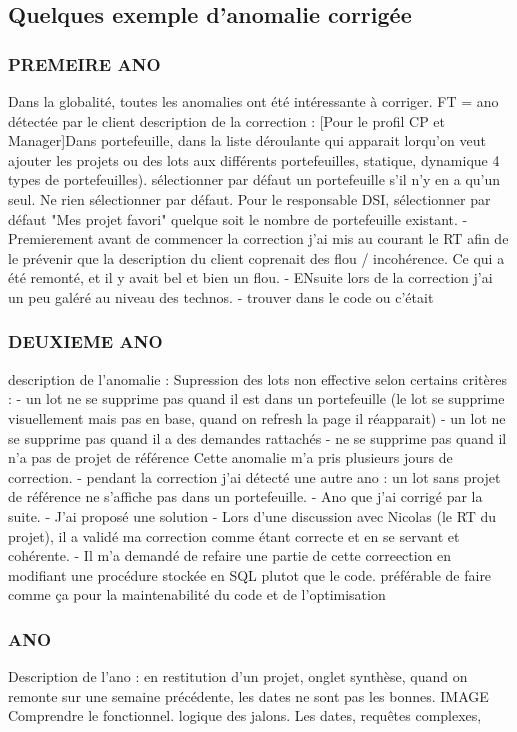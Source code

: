 \subsection{Quelques exemple d'anomalie corrigée}
\subsubsection{PREMEIRE ANO}
Dans la globalité, toutes les anomalies ont été intéressante à corriger.
FT = ano détectée par le client
description de la correction : [Pour le profil CP et Manager]Dans portefeuille, dans la liste déroulante qui apparait lorqu'on veut ajouter les projets ou des lots aux différents portefeuilles, statique, dynamique 4 types de portefeuilles). sélectionner par défaut un portefeuille s'il n'y en a qu'un seul. Ne rien sélectionner par défaut. Pour le responsable DSI, sélectionner par défaut "Mes projet favori" quelque soit le nombre de portefeuille existant.
- Premierement avant de commencer la correction j'ai mis au courant le RT afin de le prévenir que la description du client coprenait des flou / incohérence. Ce qui a été remonté, et il y avait bel et bien un flou.
- ENsuite lors de la correction j'ai un peu galéré au niveau des technos. 
- trouver dans le code ou c'était
\subsubsection{DEUXIEME ANO}
description de l'anomalie : Supression des lots non effective selon certains critères : 
- un lot ne se supprime pas quand il est dans un portefeuille (le lot se supprime visuellement mais pas en base, quand on refresh la page il réapparait)
- un lot ne se supprime pas quand il a des demandes rattachés
- ne se supprime pas quand il n'a pas de projet de référence
Cette anomalie m'a pris plusieurs jours de correction. 
- pendant la correction j'ai détecté une autre ano : un lot sans projet de référence ne s'affiche pas dans un portefeuille. 
- Ano que j'ai corrigé par la suite.
- J'ai proposé une solution
- Lors d'une discussion avec Nicolas (le RT du projet), il a validé ma correction comme étant correcte et en se servant et cohérente.
- Il m'a demandé de refaire une partie de cette correection en modifiant une procédure stockée en SQL plutot que le code. 
préférable de faire comme ça pour la maintenabilité du code et de l'optimisation 
\subsubsection{ANO}
Description de l'ano : en restitution d'un projet, onglet synthèse, quand on remonte sur une semaine précédente, les dates ne sont pas les bonnes. 
IMAGE
Comprendre le fonctionnel. logique des jalons.
Les dates, 
requêtes complexes, 
